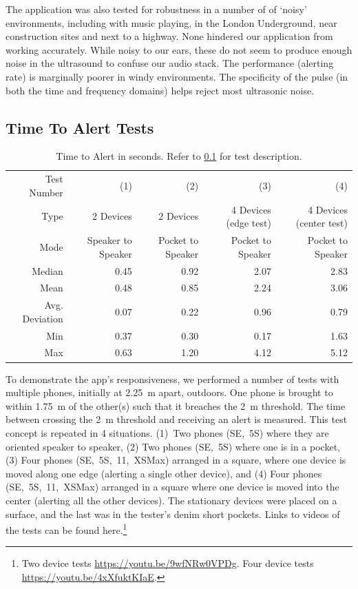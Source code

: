 \documentclass{article}
\begin{document}
The application was also tested for robustness in a number of of `noisy' environments, including with music playing, in the London Underground, near construction sites and next to a highway. None hindered our application from working accurately. While noisy to our ears, these do not seem to produce enough noise in the ultrasound to confuse our audio stack. The performance (alerting rate) is marginally poorer in windy environments. The specificity of the pulse (in both the time and frequency domains) helps reject most ultrasonic noise.


\subsection{Time To Alert Tests}
\label{sec:timeToAlert}
\FloatBarrier
\begin{table}[tb]
\centering
\caption{Time to Alert in seconds. Refer to \cref{sec:timeToAlert} for test description.}
\begin{tabular}{@{}rrrrr@{}}
\toprule
Test Number & (1) & (2) & (3) & (4) \\
Type & 2 Devices & 2 Devices & 4 Devices (edge test) & 4 Devices (center test)\\
Mode & Speaker to Speaker & Pocket to Speaker & Pocket to Speaker & Pocket to Speaker\\ \midrule
Median & 0.45 & 0.92 & 2.07 & 2.83 \\
Mean & 0.48 & 0.85 & 2.24 & 3.06 \\
Avg. Deviation & 0.07 & 0.22 & 0.96 & 0.79 \\
Min & 0.37 & 0.30 & 0.17 & 1.63 \\
Max & 0.63 & 1.20 & 4.12 & 5.12 \\ \bottomrule
\end{tabular}
\label{tbl:timeToAlert}
\end{table}

To demonstrate the app's responsiveness, we performed a number of tests with multiple phones, initially at 2.25~m apart, outdoors. One phone is brought to within 1.75~m of the other(s) such that it breaches the 2~m threshold. The time between crossing the 2~m threshold and receiving an alert is measured. This test concept is repeated in 4 situations. (1)~Two phones (SE,~5S) where they are oriented speaker to speaker, (2) Two phones (SE,~5S) where one is in a pocket, (3) Four phones (SE,~5S,~11,~XSMax) arranged in a square, where one device is moved along one edge (alerting a single other device), and (4) Four phones (SE,~5S,~11,~XSMax) arranged in a square where one device is moved into the center (alerting all the other devices). The stationary devices were placed on a surface, and the last was in the tester's denim short pockets. Links to videos of the tests can be found here.\footnote{  Two device tests \url{https://youtu.be/9wfNRw0VPDg}. Four device tests \url{https://youtu.be/4xXfuktKIaE}. }
\end{document}
